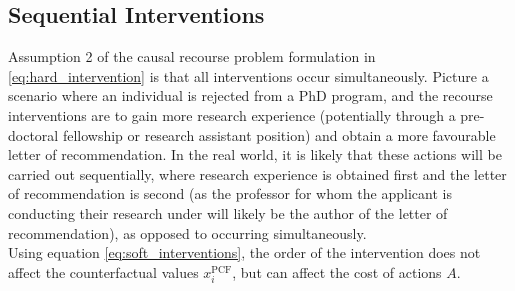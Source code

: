 \subsection{Sequential Interventions}

Assumption 2 of the causal recourse problem formulation in \ref{eq:hard_intervention} is that all interventions occur simultaneously. Picture a scenario where an individual is rejected from a PhD program, and the recourse interventions are to gain more research experience (potentially through a pre-doctoral fellowship or research assistant position) and obtain a more favourable letter of recommendation. In the real world, it is likely that these actions will be carried out sequentially, where research experience is obtained first and the letter of recommendation is second (as the professor for whom the applicant is conducting their research under will likely be the author of the letter of recommendation), as opposed to occurring simultaneously.\\

Using equation \ref{eq:soft_interventions}, the order of the intervention does not affect the counterfactual values $x^{\text{PCF}}_i$, but can affect the cost of actions $A$.\\


